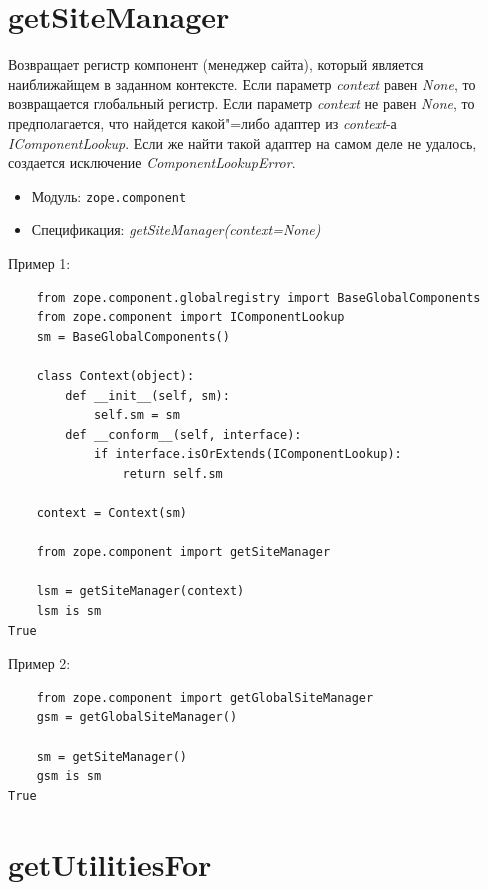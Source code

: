 \documentclass[a4paper,openany,twoside,final]{book}
\providecommand*{\DUroletitlereference}[1]{\textsl{#1}}
\begin{document}
\section*{getSiteManager%
  \label{getsitemanager}%
}

Возвращает регистр компонент (менеджер сайта), который является наиближайщем в заданном контексте. Если параметр \DUroletitlereference{context} равен \DUroletitlereference{None}, то возвращается глобальный регистр.  Если параметр \DUroletitlereference{context} не равен \DUroletitlereference{None}, то предполагается, что найдется какой"=либо адаптер из \DUroletitlereference{context}-а \DUroletitlereference{IComponentLookup}.  Если же найти такой адаптер на самом деле не удалось, создается исключение \DUroletitlereference{ComponentLookupError}.

\begin{itemize}

\item Модуль: \texttt{zope.component}

\item Спецификация: \DUroletitlereference{getSiteManager(context=None)}

\end{itemize}

Пример 1:

\begin{verbatim}
    from zope.component.globalregistry import BaseGlobalComponents
    from zope.component import IComponentLookup
    sm = BaseGlobalComponents()

    class Context(object):
        def __init__(self, sm):
            self.sm = sm
        def __conform__(self, interface):
            if interface.isOrExtends(IComponentLookup):
                return self.sm

    context = Context(sm)

    from zope.component import getSiteManager

    lsm = getSiteManager(context)
    lsm is sm
True
\end{verbatim}

Пример 2:

\begin{verbatim}
    from zope.component import getGlobalSiteManager
    gsm = getGlobalSiteManager()

    sm = getSiteManager()
    gsm is sm
True
\end{verbatim}


\section*{getUtilitiesFor%
  \label{getutilitiesfor}%
}
\end{document}
